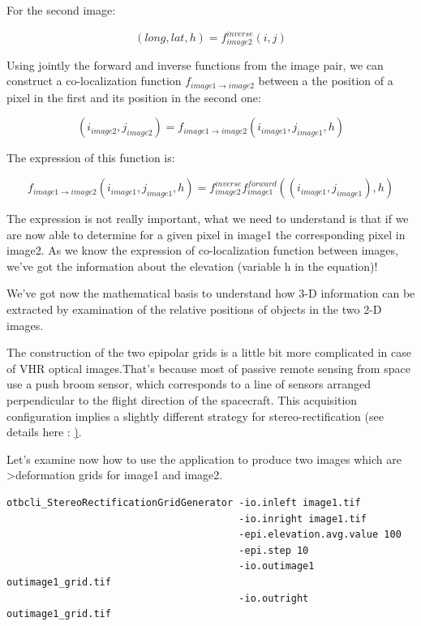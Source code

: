For the second image:

\begin{equation}
   (long,lat,h) = f^{inverse}_{image2}(i,j)
\end{equation}

Using jointly the forward and inverse functions from the image pair, we can
construct a co-localization function $f_{image1 \rightarrow image2}$ between a
the position of a pixel in the first and its position in the second one:

\begin{equation}
(i_{image2},j_{image2}) = f_{image1 \rightarrow image2} (i_{image1} , j_{image1} , h)
\end{equation}

The expression of this function is:

\begin{equation}
f_{image1 \rightarrow image2} (i_{image1} , j_{image1} , h) =  f^{inverse}_{image2} f^{forward}_{image1}((i_{image1} , j_{image1}), h)
\end{equation}

The expression is not really important, what we need to understand is that if we
are now able to determine for a given pixel in image1 the corresponding pixel in
image2.  As we know the expression of co-localization function between images,
we've got the information about the elevation (variable h in the equation)!

We've got now the mathematical basis to understand how 3-D information can be
extracted by examination of the relative positions of objects in the two 2-D
images.

The construction of the two epipolar grids is a little bit more complicated in
case of VHR optical images.That's because most of passive remote sensing from
space use a push broom sensor, which corresponds to a line of sensors arranged
perpendicular to the flight direction of the spacecraft. This acquisition
configuration implies a slightly different strategy for stereo-rectification
(see details here :
\href{http://en.wikipedia.org/wiki/Epipolar_geometry#Epipolar_geometry_of_pushbroom_sensor}).

Let's examine now how to use the 
application to produce two images which are \textgreater{deformation grids} for
image1 and image2.

\begin{verbatim}
otbcli_StereoRectificationGridGenerator -io.inleft image1.tif
                                        -io.inright image1.tif
                                        -epi.elevation.avg.value 100
                                        -epi.step 10
                                        -io.outimage1 outimage1_grid.tif
                                        -io.outright outimage1_grid.tif
\end{verbatim}

